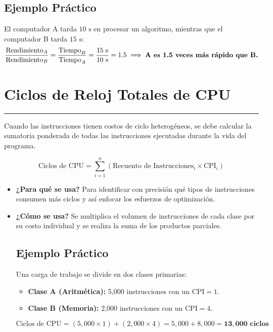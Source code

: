 \documentclass[12pt,a4paper]{article}
\begin{document}
\begin{itemize}[leftmargin=*]
\begin{itemize}[leftmargin=*]
\subsection*{Ejemplo Práctico}
El computador A tarda $10\text{ s}$ en procesar un algoritmo, mientras que el computador B tarda $15\text{ s}$:
\[
\frac{\text{Rendimiento}_A}{\text{Rendimiento}_B} = \frac{\text{Tiempo}_B}{\text{Tiempo}_A} = \frac{15\text{ s}}{10\text{ s}} = 1.5 \implies \text{\textbf{A es 1.5 veces más rápido que B.}}
\]

\section{\textbf{Ciclos de Reloj Totales de CPU}}
{\color{moradovivo}\hrule height 1pt} \vspace{0.3cm}
Cuando las instrucciones tienen costos de ciclo heterogéneos, se debe calcular la sumatoria ponderada de todas las instrucciones ejecutadas durante la vida del programa.

\begin{tcolorbox}
\[
\text{Ciclos de CPU} = \sum_{i=1}^{n} (\text{Recuento de Instrucciones}_i \times \text{CPI}_i)
\]
\end{tcolorbox}

\begin{itemize}[leftmargin=*]
    Es la cantidad total de pulsos de reloj que absorbe el procesador desglosada por categorías de instrucción (aritmética, memoria, saltos).
    \item \textbf{¿Para qué se usa?} Para identificar con precisión qué tipos de instrucciones consumen más ciclos y así enfocar los esfuerzos de optimización.
    \item \textbf{¿Cómo se usa?} Se multiplica el volumen de instrucciones de cada clase por su costo individual y se realiza la suma de los productos parciales.


\subsection*{Ejemplo Práctico}
Una carga de trabajo se divide en dos clases primarias:
\begin{itemize}
    \item \textbf{Clase A (Aritmética):} 5,000 instrucciones con un $\text{CPI} = 1$.
    \item \textbf{Clase B (Memoria):} 2,000 instrucciones con un $\text{CPI} = 4$.
\end{itemize}
\[
\text{Ciclos de CPU} = (5,000 \times 1) + (2,000 \times 4) = 5,000 + 8,000 = \mathbf{13,000\text{ ciclos}}
\]


\end{itemize}
\end{itemize}
\end{itemize}
\end{document}

